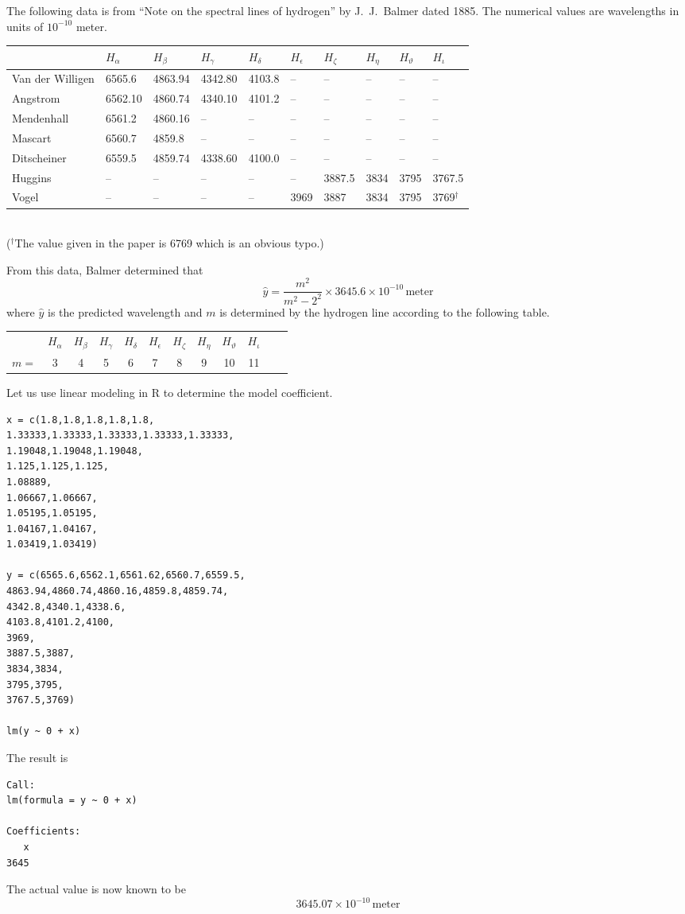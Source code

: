 \documentclass[12pt]{article}
\begin{document}
\noindent
The following data is from
``Note on the spectral lines of hydrogen''
by J.~J.~Balmer dated 1885.
The numerical values are wavelengths in units of $10^{-10}$ meter.

\begin{center}
\footnotesize
\begin{tabular}{|l|l|l|l|l|l|l|l|l|l|}
\hline
 & $H_\alpha$ & $H_\beta$ & $H_\gamma$ & $H_\delta$ & $H_\epsilon$ &
$H_\zeta$ & $H_\eta$ & $H_\vartheta$ & $H_\iota$
\\
\hline
Van der Willigen & 6565.6 & 4863.94 & 4342.80 & 4103.8 & -- & -- & -- & -- & --
\\
Angstrom & 6562.10 & 4860.74 & 4340.10 & 4101.2 & -- & -- & -- & -- & --
\\
Mendenhall & 6561.2 & 4860.16 & -- & -- & -- & -- & -- & -- & --
\\
Mascart & 6560.7 & 4859.8 & -- & -- & -- & -- & -- & -- & --
\\
Ditscheiner & 6559.5 & 4859.74 & 4338.60 & 4100.0 & -- & -- & -- & -- & --
\\
Huggins & -- & -- & -- & -- & -- & 3887.5 & 3834 & 3795 & 3767.5
\\
Vogel & -- & -- & -- & -- & 3969 & 3887 & 3834 & 3795 & 3769${}^\dag$
\\
\hline
\end{tabular}
\\
{\footnotesize(${}^\dag$The value given in the paper is 6769 which is an obvious typo.)}
\end{center}

\noindent
From this data, Balmer determined that
\begin{equation*}
\hat{y}=\frac{m^2}{m^2-2^2}\times3645.6\times10^{-10}\,\text{meter}
\end{equation*}
where $\hat{y}$ is the predicted wavelength and $m$ is determined by the hydrogen line
according to the following table.
\begin{center}
\begin{tabular}{cccccccccccc}
& $H_\alpha$ & $H_\beta$ & $H_\gamma$ & $H_\delta$ & $H_\epsilon$ &
$H_\zeta$ & $H_\eta$ & $H_\vartheta$ & $H_\iota$
\\
$m=$ & 3 & 4 & 5 & 6 & 7 & 8 & 9 & 10 & 11
\end{tabular}
\end{center}

\noindent
Let us use linear modeling in R to determine the model coefficient.
{\footnotesize\color{blue}
\begin{verbatim}
x = c(1.8,1.8,1.8,1.8,1.8,
1.33333,1.33333,1.33333,1.33333,1.33333,
1.19048,1.19048,1.19048,
1.125,1.125,1.125,
1.08889,
1.06667,1.06667,
1.05195,1.05195,
1.04167,1.04167,
1.03419,1.03419)

y = c(6565.6,6562.1,6561.62,6560.7,6559.5,
4863.94,4860.74,4860.16,4859.8,4859.74,
4342.8,4340.1,4338.6,
4103.8,4101.2,4100,
3969,
3887.5,3887,
3834,3834,
3795,3795,
3767.5,3769)

lm(y ~ 0 + x)
\end{verbatim}
}

\bigskip
\noindent
The result is
{\footnotesize
\begin{verbatim}
Call:
lm(formula = y ~ 0 + x)

Coefficients:
   x  
3645
\end{verbatim}
}

\noindent
The actual value is now known to be
\begin{equation*}
3645.07\times10^{-10}\,\text{meter}
\end{equation*}
\end{document}

